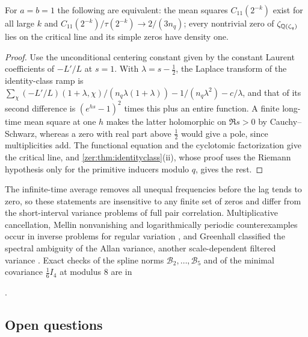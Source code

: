 \begin{corollary}\label{zer:cor:critline}
For $a=b=1$ the following are equivalent: the mean squares $C_{11}(2^{-k})$ exist for all large $k$ and
$C_{11}(2^{-k})/\tau(2^{-k})\to2/(3n_q)$; every nontrivial zero of $\zeta_{\mathbb{Q}(\zeta_q)}$ lies on the
critical line and its simple zeros have density one.
\end{corollary}
\begin{proof}
Use the unconditional centering constant given by the constant Laurent coefficients of $-L'/L$ at
$s=1$. With $\lambda=s-\tfrac12$, the Laplace transform of the identity-class ramp is
$\sum_\chi(-L'/L)(1+\lambda,\chi)/(n_q\lambda(1+\lambda))-1/(n_q\lambda^2)-c/\lambda$, and that of its second
difference is $(e^{hs}-1)^2$ times this plus an entire function. A finite long-time mean square at one
$h$ makes the latter holomorphic on $\Re s>0$ by Cauchy--Schwarz, whereas a zero with real part above
$\tfrac12$ would give a pole, since multiplicities add. The functional equation and the cyclotomic
factorization give the critical line, and \cref{zer:thm:identityclass}(ii), whose proof uses the Riemann
hypothesis only for the primitive inducers modulo $q$, gives the rest.
\end{proof}

The infinite-time average removes all unequal frequencies before the lag tends to zero, so these
statements are insensitive to any finite set of zeros and differ from the short-interval variance
problems of full pair correlation. Multiplicative cancellation, Mellin nonvanishing and logarithmically
periodic counterexamples occur in inverse problems for regular variation
\cite{JacobsenMikoschRosinskiSamorodnitsky2009Inverse,DamekMikoschRosinskiSamorodnitsky2014General}, and
Greenhall classified the spectral ambiguity of the Allan variance, another scale-dependent filtered
variance \cite{Greenhall1998Spectral}. Exact checks of
the spline norms $\mathcal B_2,\dots,\mathcal B_5$ and of the minimal covariance $\tfrac16I_4$ at modulus
$8$ are in
\begin{center}.\end{center}

\subsection{Open questions}\label{flu:sec:open}
{\raggedright{}}

